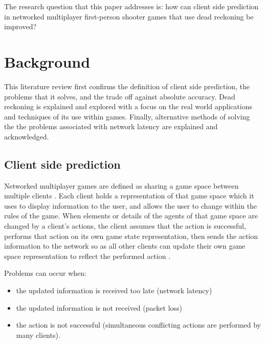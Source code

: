 \documentclass[journal]{IEEEtran}
\begin{document}
The research question that this paper addresses is: how can client side prediction in networked multiplayer first-person shooter games that use dead reckoning be improved?

\section{Background}

This literature review first confirms the definition of client side prediction, the problems that it solves, and the trade off against absolute accuracy. Dead reckoning is explained and explored with a focus on the real world applications and techniques of its use within games. Finally, alternative methods of solving the the problems associated with network latency are explained and acknowledged.

\subsection{Client side prediction} \label{clientSidePrediction}

Networked multiplayer games are defined as sharing a game space between multiple clients \cite{diot1999distributed}. Each client holds a representation of that game space which it uses to display information to the user, and allows the user to change within the rules of the game. When elements or details of the agents of that game space are changed by a client's actions, the client assumes that the action is successful, performs that action on its own game state representation, then sends the action information to the network so as all other clients can update their own game space representation to reflect the performed action \cite{bernier2001latency}.

Problems can occur when:
\begin{itemize}
    \item the updated information is received too late (network latency)
    \item the updated information is not received (packet loss)
    \item the action is not successful (simultaneous conflicting actions are performed by many clients).
\end{itemize}
\end{document}
